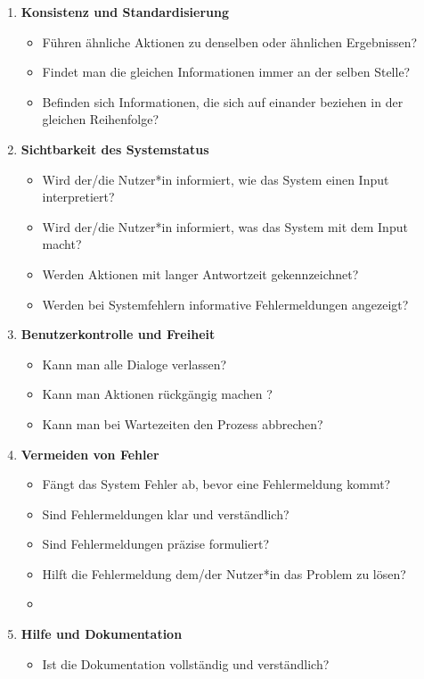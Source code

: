 \documentclass[utf8,biblatex]{lni}
\begin{document}
\begin{appendices}
\begin{enumerate}
\begin{itemize}
  \end{itemize}
  \item \textbf{Konsistenz und Standardisierung}
  \begin{itemize}
    \item Führen ähnliche Aktionen zu denselben oder ähnlichen Ergebnissen?
    \item Findet man die gleichen Informationen immer an der selben Stelle?
    \item Befinden sich Informationen, die sich auf einander beziehen in der gleichen Reihenfolge?
  \end{itemize}
  \item \textbf{Sichtbarkeit des Systemstatus}
  \begin{itemize}
    \item Wird der/die Nutzer*in informiert, wie das System einen Input interpretiert?
    \item Wird der/die Nutzer*in informiert, was das System mit dem Input macht?
    \item Werden Aktionen mit langer Antwortzeit gekennzeichnet?
    \item Werden bei Systemfehlern informative Fehlermeldungen angezeigt?
  \end{itemize}
  \item \textbf{Benutzerkontrolle und Freiheit}
  \begin{itemize}
    \item Kann man alle Dialoge verlassen?
    \item Kann man Aktionen rückgängig machen ?
    \item Kann man bei Wartezeiten den Prozess abbrechen?
  \end{itemize}
  \item \textbf{Vermeiden von Fehler}
  \begin{itemize}
    \item Fängt das System Fehler ab, bevor eine Fehlermeldung kommt?
    \item Sind Fehlermeldungen klar und verständlich?
    \item Sind Fehlermeldungen präzise formuliert?
    \item Hilft die Fehlermeldung dem/der Nutzer*in das Problem zu lösen?
    \item 
  \end{itemize}
  \item \textbf{Hilfe und Dokumentation}
  \begin{itemize}
    \item Ist die Dokumentation vollständig und verständlich?

\end{itemize}
\end{enumerate}
\end{appendices}
\end{document}
